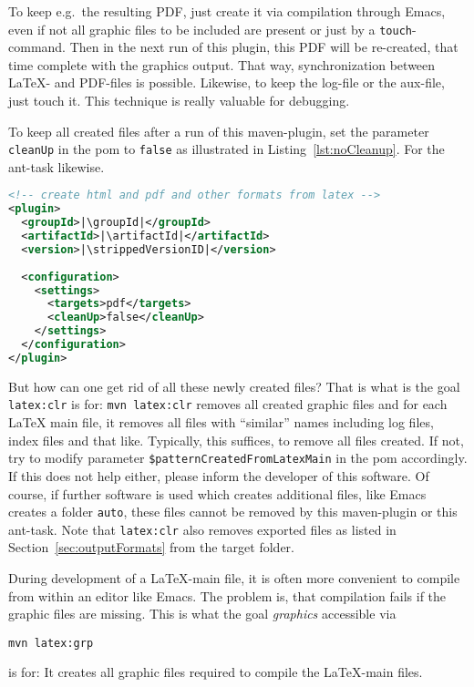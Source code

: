 To keep e.g.~the resulting PDF, 
just create it via compilation through Emacs, 
even if not all graphic files to be included are present 
or just by a \texttt{touch}-command. 
Then in the next run of this plugin, 
this PDF will be re-created, 
that time complete with the graphics output. 
That way, synchronization between \LaTeX- and PDF-files is possible. 
Likewise, to keep the log-file or the aux-file, just touch it. 
This technique is really valuable for debugging. 

To keep all created files after a run of this maven-plugin, 
set the parameter \texttt{cleanUp} in the pom 
to \texttt{false} as illustrated in Listing~\ref{lst:noCleanup}. 
For the ant-task likewise. 

\begin{lstlisting}[language=xml, basicstyle=\small,
escapechar=|,
float=b, captionpos=b, label={lst:noCleanup},
caption={Configuration without cleanup}]
<!-- create html and pdf and other formats from latex -->
<plugin>
  <groupId>|\groupId|</groupId>
  <artifactId>|\artifactId|</artifactId>
  <version>|\strippedVersionID|</version>
	
  <configuration>
    <settings>
      <targets>pdf</targets>
      <cleanUp>false</cleanUp>
    </settings>
  </configuration>
</plugin>
\end{lstlisting}


But how can one get rid of all these newly created files? 
That is what is the goal \texttt{latex:clr} is for: 
% 
\texttt{mvn latex:clr}
%
removes all created graphic files 
and for each \LaTeX{} main file, it removes all files with ``similar'' names
including log files, index files and that like.
Typically, this suffices, to remove all files created. 
If not, 
try to modify parameter \texttt{\$patternCreatedFromLatexMain} 
in the pom accordingly. 
If this does not help either, please inform the developer of this software. 
Of course, if further software is used which creates additional files, 
like Emacs creates a folder \texttt{auto}, 
these files cannot be removed by this maven-plugin or this ant-task.
Note that \texttt{latex:clr}
also removes exported files as listed in Section~\ref{sec:outputFormats}
from the target folder. 

During development of a \LaTeX-main file, 
it is often more convenient to compile from within an editor like Emacs. 
The problem is, that compilation fails if the graphic files are missing. 
This is what the goal \emph{graphics} accessible via 
% 
\begin{Verbatim}
mvn latex:grp
\end{Verbatim}
%
is for: 
It creates all graphic files required to compile the \LaTeX-main files. 

